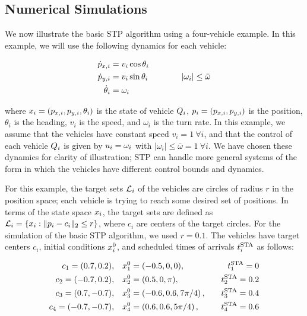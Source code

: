 \subsection{Numerical Simulations \label{sec:basic_results}}
We now illustrate the basic STP algorithm using a four-vehicle example. In this example, we will use the following dynamics for each vehicle:

\begin{equation} \label{eqn:NumSimpleDyn}
\begin{aligned}
\dot{\pos}_{x,i} &= v_i \cos\theta_i \\
\dot{\pos}_{y,i} &= v_i \sin\theta_i \qquad \qquad |\omega_i| \le \bar\omega \\
\dot \theta_i &= \omega_i \\
\end{aligned}
\end{equation}

\noindent where $x_i = (p_{x,i}, p_{y,i}, \theta_i)$ is the state of vehicle $Q_i$, $p_i = (p_{x,i}, p_{y,i})$ is the position, $\theta_i$ is the heading, $v_i$ is the speed, and $\omega_i$ is the turn rate. In this example, we assume that the vehicles have constant speed $v_i = 1 ~ \forall i$, and that the control of each vehicle $Q_i$ is given by $u_i = \omega_i$ with $|\omega_i| \le \bar\omega = 1 ~ \forall i$. We have chosen these dynamics for clarity of illustration; STP can handle more general systems of the form in which the vehicles have different control bounds and dynamics. 

For this example, the target sets $\mathcal{L}_i$ of the vehicles are circles of radius $r$ in the position space; each vehicle is trying to reach some desired set of positions. In terms of the state space $x_i$, the target sets are defined as $\mathcal{L}_i = \{x_i: \|p_i - c_i\|_2 \le r\}$, where $c_i$ are centers of the target circles. For the simulation of the basic STP algorithm, we used $r = 0.1$. The vehicles have target centers $c_i$, initial conditions $x_i^0$, and scheduled times of arrivals $t^\text{STA}_i$ as follows:

\begin{equation} \label{eqn:NumIC}
\begin{aligned}
c_1 = (0.7, 0.2), \quad& \state_1^0 = (-0.5, 0, 0), \quad & \sta_1 = 0 \\
c_2 = (-0.7, 0.2), \quad& \state_2^0 = (0.5, 0, \pi), \quad & \sta_2 = 0.2 \\
c_3 = (0.7, -0.7), \quad& \state_3^0 = \left(-0.6, 0.6, 7\pi/4\right), \quad & \sta_3 = 0.4\\
c_4 = (-0.7, -0.7), \quad & \state_4^0 = \left(0.6, 0.6, 5\pi/4\right), \quad & \sta_4 = 0.6
\end{aligned}
\end{equation}

